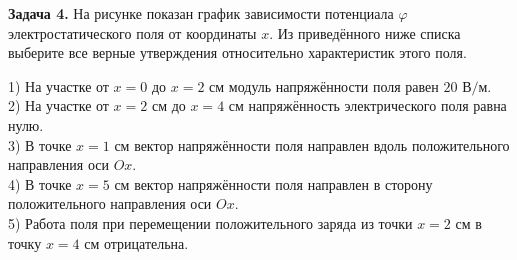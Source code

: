 \begin{taskbasic}[code={\label{task:elem_pot_v6_n15}}]
\textbf{Задача 4.} На рисунке показан график зависимости потенциала $\varphi$ электростатического поля от координаты $x$. Из приведённого ниже списка выберите все верные утверждения относительно характеристик этого поля.

\nopagebreak\smallskip
\begin{center}
\end{center}

1) На участке от $x = 0$ до $x = 2\text{ см}$ модуль напряжённости поля равен $20\text{ В/м}$.\\
2) На участке от $x = 2\text{ см}$ до $x = 4\text{ см}$ напряжённость электрического поля равна нулю.\\
3) В точке $x = 1\text{ см}$ вектор напряжённости поля направлен вдоль положительного направления оси $Ox$.\\
4) В точке $x = 5\text{ см}$ вектор напряжённости поля направлен в сторону положительного направления оси $Ox$.\\
5) Работа поля при перемещении положительного заряда из точки $x = 2\text{ см}$ в точку $x = 4\text{ см}$ отрицательна.

\end{taskbasic}

